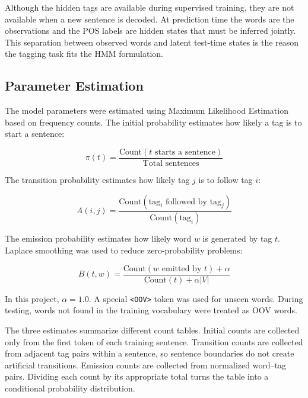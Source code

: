 \documentclass[12pt,a4paper]{article}
\begin{document}
Although the hidden tags are available during supervised training, they are not
available when a new sentence is decoded. At prediction time the words are the
observations and the POS labels are hidden states that must be inferred jointly.
This separation between observed words and latent test-time states is the reason
the tagging task fits the HMM formulation.

\subsection{Parameter Estimation}

The model parameters were estimated using Maximum Likelihood Estimation based on
frequency counts. The initial probability estimates how likely a tag is to start
a sentence:

\begin{equation}
\pi(t) = \frac{\text{Count}(t \text{ starts a sentence})}
{\text{Total sentences}}
\end{equation}

The transition probability estimates how likely tag $j$ is to follow tag $i$:

\begin{equation}
A(i,j) = \frac{\text{Count}(\text{tag}_i \text{ followed by } \text{tag}_j)}
{\text{Count}(\text{tag}_i)}
\end{equation}

The emission probability estimates how likely word $w$ is generated by tag $t$.
Laplace smoothing was used to reduce zero-probability problems:

\begin{equation}
B(t,w) = \frac{\text{Count}(w \text{ emitted by } t) + \alpha}
{\text{Count}(t) + \alpha |V|}
\end{equation}

In this project, $\alpha = 1.0$. A special
\texttt{\textless OOV\textgreater} token was used for unseen words. During
testing, words not found in the training vocabulary were treated as OOV words.

The three estimates summarize different count tables. Initial counts are
collected only from the first token of each training sentence. Transition counts
are collected from adjacent tag pairs within a sentence, so sentence boundaries
do not create artificial transitions. Emission counts are collected from
normalized word--tag pairs. Dividing each count by its appropriate total turns
the table into a conditional probability distribution.
\end{document}

